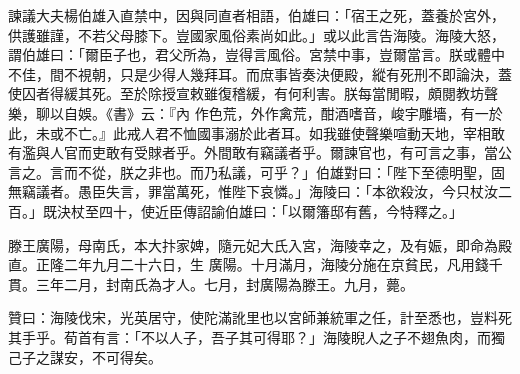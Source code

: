 \begin{pinyinscope}
 諫議大夫楊伯雄入直禁中，因與同直者相語，伯雄曰：「宿王之死，蓋養於宮外，供護雖謹，不若父母膝下。豈國家風俗素尚如此。」或以此言告海陵。海陵大怒，謂伯雄曰：「爾臣子也，君父所為，豈得言風俗。宮禁中事，豈爾當言。朕或體中不佳，間不視朝，只是少得人幾拜耳。而庶事皆奏決便殿，縱有死刑不即論決，蓋使囚者得緩其死。至於除授宣敕雖復稽緩，有何利害。朕每當閒暇，頗閱教坊聲樂，聊以自娛。《書》云：『內
 作色荒，外作禽荒，酣酒嗜音，峻宇雕墻，有一於此，未或不亡。』此戒人君不恤國事溺於此者耳。如我雖使聲樂喧動天地，宰相敢有濫與人官而吏敢有受賕者乎。外間敢有竊議者乎。爾諫官也，有可言之事，當公言之。言而不從，朕之非也。而乃私議，可乎？」伯雄對曰：「陛下至德明聖，固無竊議者。愚臣失言，罪當萬死，惟陛下哀憐。」海陵曰：「本欲殺汝，今只杖汝二百。」既決杖至四十，使近臣傳詔諭伯雄曰：「以爾籓邸有舊，今特釋之。」



 滕王廣陽，母南氏，本大抃家婢，隨元妃大氏入宮，海陵幸之，及有娠，即命為殿直。正隆二年九月二十六日，生
 廣陽。十月滿月，海陵分施在京貧民，凡用錢千貫。三年二月，封南氏為才人。七月，封廣陽為滕王。九月，薨。



 贊曰：海陵伐宋，光英居守，使陀滿訛里也以宮師兼統軍之任，計至悉也，豈料死其手乎。荀首有言：「不以人子，吾子其可得耶？」海陵睨人之子不翅魚肉，而獨己子之謀安，不可得矣。



\end{pinyinscope}